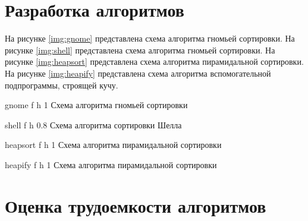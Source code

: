 \section{Разработка алгоритмов}

На рисунке \ref{img:gnome} представлена схема алгоритма гномьей сортировки. 
На рисунке \ref{img:shell} представлена схема алгоритма гномьей сортировки. 
На рисунке \ref{img:heapsort} представлена схема алгоритма пирамидальной сортировки. 
На рисунке \ref{img:heapify} представлена схема алгоритма вспомогательной подпрограммы, строящей кучу.
\clearpage

{gnome} %
{f} %
{h} %
{1\textwidth} %
{Схема алгоритма гномьей сортировки} %

{shell} %
{f} %
{h} %
{0.8\textwidth} %
{Схема алгоритма сортировки Шелла} %


{heapsort} %
{f} %
{h} %
{1\textwidth} %
{Схема алгоритма пирамидальной сортировки} %

{heapify} %
{f} %
{h} %
{1\textwidth} %
{Схема алгоритма пирамидальной сортировки} %

\clearpage

\section{Оценка трудоемкости алгоритмов}

